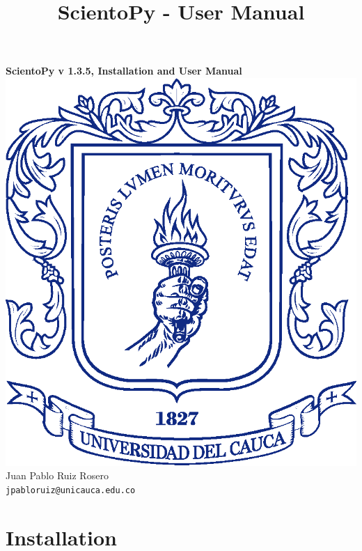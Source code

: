 \documentclass[10pt,letterpaper]{article}
\title{ScientoPy - User Manual}
\begin{document}
\begin{center}
{\LARGE \textbf{ScientoPy v 1.3.5, Installation and User Manual\\}}
\vspace*{0.5cm}
\includegraphics[scale=0.2]{./figures/escudoUnicacuaSolo.eps}\\
\vspace*{0.5cm}
Juan Pablo Ruiz Rosero\\
\texttt{jpabloruiz@unicauca.edu.co} \\
\end{center}

\tableofcontents

\newpage

\section{Installation}
\end{document}
